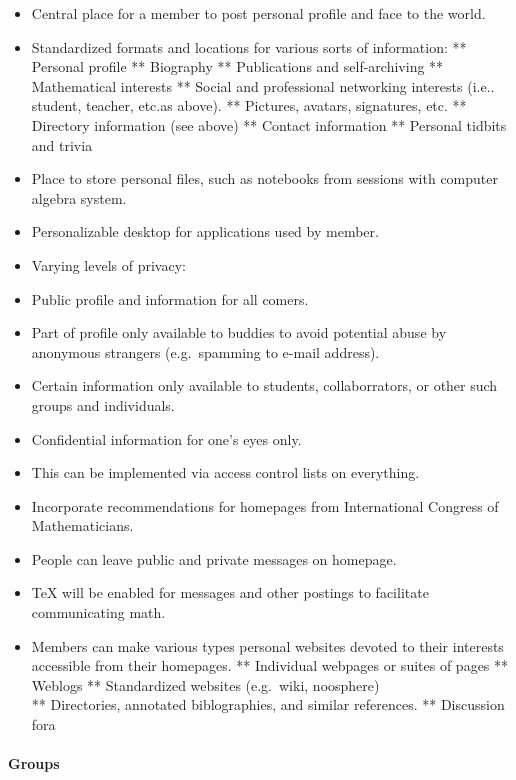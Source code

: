 \begin{itemize}
\begin{itemize}
\item
  Central place for a member to post personal profile and face to the
  world.
\item
  Standardized formats and locations for various sorts of information:
  ** Personal profile ** Biography ** Publications and self-archiving **
  Mathematical interests ** Social and professional networking interests
  (i.e.. student, teacher, etc.as above). ** Pictures, avatars,
  signatures, etc. ** Directory information (see above) ** Contact
  information ** Personal tidbits and trivia
\item
  Place to store personal files, such as notebooks from sessions with
  computer algebra system.
\item
  Personalizable desktop for applications used by member.
\item
  Varying levels of privacy:
\item
  Public profile and information for all comers.
\item
  Part of profile only available to buddies to avoid potential abuse by
  anonymous strangers (e.g.~spamming to e-mail address).
\item
  Certain information only available to students, collaborrators, or
  other such groups and individuals.
\item
  Confidential information for one's eyes only.
\item
  This can be implemented via access control lists on everything.
\item
  Incorporate recommendations for homepages from International Congress
  of Mathematicians.
\item
  People can leave public and private messages on homepage.
\item
  TeX will be enabled for messages and other postings to facilitate
  communicating math.
\item
  Members can make various types personal websites devoted to their
  interests accessible from their homepages. ** Individual webpages or
  suites of pages ** Weblogs ** Standardized websites (e.g.~wiki,
  noosphere)\\ ** Directories, annotated biblographies, and similar
  references. ** Discussion fora
\end{itemize}

\paragraph{Groups}


\end{itemize}

